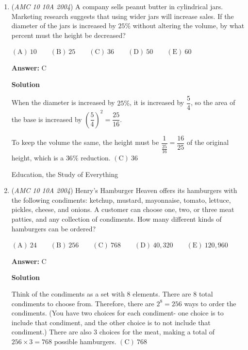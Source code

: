 \begin{enumerate}
 Therefore, the probabiliy of flipping the same number of heads is:$\frac{1+12+18+4}{128}=\frac{35}{128}\Rightarrow\boxed{\mathrm{(D)}\ \frac{35}{128}}$

 Education, the Study of Everything

 


	\item (\textit{AMC 10 10A 2004}) A company sells peanut butter in cylindrical jars.  Marketing research suggests that using wider jars will increase sales.  If the diameter of the jars is increased by $25\%$ without altering the volume, by what percent must the height be decreased?


 $\mathrm{(A) \ } 10 \qquad \mathrm{(B) \ } 25 \qquad \mathrm{(C) \ } 36 \qquad \mathrm{(D) \ } 50 \qquad \mathrm{(E) \ } 60$

 \textbf{Answer: }C



\textbf{Solution}

When the diameter is increased by $25\%$, it is increased by $\dfrac{5}{4}$, so the area of the base is increased by $\left(\dfrac54\right)^2=\dfrac{25}{16}$.

 To keep the volume the same, the height must be $\dfrac{1}{\frac{25}{16}}=\dfrac{16}{25}$ of the original height, which is a $36\%$ reduction. $\boxed{\mathrm{(C)}\ 36}$

 Education, the Study of Everything

 


	\item (\textit{AMC 10 10A 2004}) Henry's Hamburger Heaven offers its hamburgers with the following condiments: ketchup, mustard, mayonnaise, tomato, lettuce, pickles, cheese, and onions.  A customer can choose one, two, or three meat patties, and any collection of condiments.  How many different kinds of hamburgers can be ordered?


 $\mathrm{(A) \ } 24 \qquad \mathrm{(B) \ } 256 \qquad \mathrm{(C) \ } 768 \qquad \mathrm{(D) \ } 40,320 \qquad \mathrm{(E) \ } 120,960$

 \textbf{Answer: }C



\textbf{Solution}

Think of the condiments as a set with 8 elements.  There are $8$ total condiments to choose from.  Therefore, there are $2^8=256$ ways to order the condiments. (You have two choices for each condiment- one choice is to include that condiment, and the other choice is to not include that condiment.) There are also $3$ choices for the meat, making a total of $256\times3=768$ possible hamburgers. $\boxed{\mathrm{(C)}\ 768}$


\end{enumerate}
